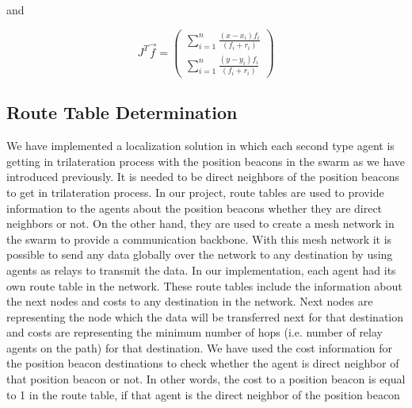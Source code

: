 and 

\begin{equation}
J^T\vec{f} = \left(\begin{matrix}
\sum_{i=1}^{n}\frac{(x-x_i)f_i}{(f_i+r_i)} \\
\sum_{i=1}^{n}\frac{(y-y_i)f_i}{(f_i+r_i)}
\end{matrix}\right)
\end{equation}
	
	
\subsection{Route Table Determination} \label{route_route}
We have implemented a localization solution in which each second type agent is getting in trilateration process with the position beacons in the swarm as we have introduced previously. It is needed to be direct neighbors of the position beacons to get in trilateration process. In our project, route tables are used to provide information to the agents about the position beacons whether they are direct neighbors or not. On the other hand, they are used to create a mesh network in the swarm to provide a communication backbone. With this mesh network it is possible to send any data globally over the network to any destination by using agents as relays to transmit the data. In our implementation, each agent had its own route table in the network. These route tables include the information about the next nodes and costs to any destination in the network. Next nodes are representing the node which the data will be transferred next for that destination and costs are representing the minimum number of hops (i.e. number of relay agents on the path) for that destination. We have used the cost information for the position beacon destinations to check whether the agent is direct neighbor of that position beacon or not. In other words, the cost to a position beacon is equal to 1 in the route table, if that agent is the direct neighbor of the position beacon


	
